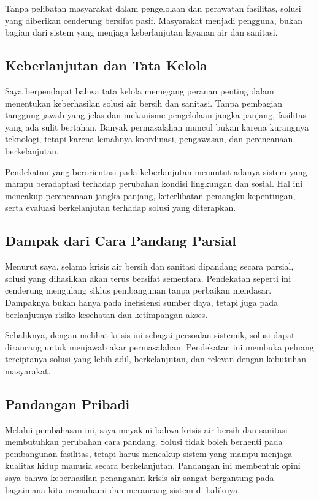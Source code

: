 \documentclass[
  letterpaper,
  DIV=11,
  numbers=noendperiod]{scrreprt}
\begin{document}
Tanpa pelibatan masyarakat dalam pengelolaan dan perawatan fasilitas,
solusi yang diberikan cenderung bersifat pasif. Masyarakat menjadi
pengguna, bukan bagian dari sistem yang menjaga keberlanjutan layanan
air dan sanitasi.

\subsection{Keberlanjutan dan Tata
Kelola}\label{keberlanjutan-dan-tata-kelola}

Saya berpendapat bahwa tata kelola memegang peranan penting dalam
menentukan keberhasilan solusi air bersih dan sanitasi. Tanpa pembagian
tanggung jawab yang jelas dan mekanisme pengelolaan jangka panjang,
fasilitas yang ada sulit bertahan. Banyak permasalahan muncul bukan
karena kurangnya teknologi, tetapi karena lemahnya koordinasi,
pengawasan, dan perencanaan berkelanjutan.

Pendekatan yang berorientasi pada keberlanjutan menuntut adanya sistem
yang mampu beradaptasi terhadap perubahan kondisi lingkungan dan sosial.
Hal ini mencakup perencanaan jangka panjang, keterlibatan pemangku
kepentingan, serta evaluasi berkelanjutan terhadap solusi yang
diterapkan.

\subsection{Dampak dari Cara Pandang
Parsial}\label{dampak-dari-cara-pandang-parsial}

Menurut saya, selama krisis air bersih dan sanitasi dipandang secara
parsial, solusi yang dihasilkan akan terus bersifat sementara.
Pendekatan seperti ini cenderung mengulang siklus pembangunan tanpa
perbaikan mendasar. Dampaknya bukan hanya pada inefisiensi sumber daya,
tetapi juga pada berlanjutnya risiko kesehatan dan ketimpangan akses.

Sebaliknya, dengan melihat krisis ini sebagai persoalan sistemik, solusi
dapat dirancang untuk menjawab akar permasalahan. Pendekatan ini membuka
peluang terciptanya solusi yang lebih adil, berkelanjutan, dan relevan
dengan kebutuhan masyarakat.

\subsection{Pandangan Pribadi}\label{pandangan-pribadi}

Melalui pembahasan ini, saya meyakini bahwa krisis air bersih dan
sanitasi membutuhkan perubahan cara pandang. Solusi tidak boleh berhenti
pada pembangunan fasilitas, tetapi harus mencakup sistem yang mampu
menjaga kualitas hidup manusia secara berkelanjutan. Pandangan ini
membentuk opini saya bahwa keberhasilan penanganan krisis air sangat
bergantung pada bagaimana kita memahami dan merancang sistem di
baliknya.
\end{document}
